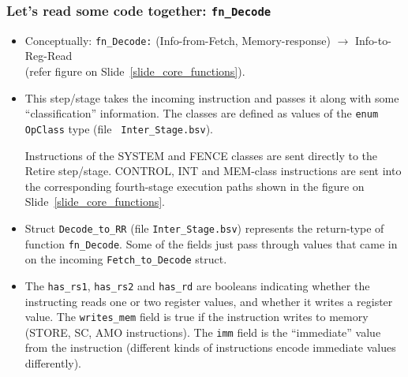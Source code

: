 \begin{frame}[fragile]
\frametitle{Let's read some code together: {\tt fn\_Decode}}

\begin{center}\scriptsize


 \vspace{1ex}

 \begin{minipage}{0.8\textwidth}
  \begin{itemize}

   \item Conceptually: {\tt fn\_Decode:} (Info-from-Fetch, Memory-response) $\rightarrow$ Info-to-Reg-Read \\
     (refer figure on Slide~\ref{slide_core_functions}).

   \item This step/stage takes the incoming instruction and passes it
     along with some ``classification'' information.  The classes are
     defined as values of the {\tt enum OpClass} type (file {\tt
     Inter\_Stage.bsv}).

     Instructions of the SYSTEM and FENCE classes are sent directly to
     the Retire step/stage.  CONTROL, INT and MEM-class instructions
     are sent into the corresponding fourth-stage execution paths
     shown in the figure on Slide~\ref{slide_core_functions}.

   \item Struct {\tt Decode\_to\_RR} (file {\tt Inter\_Stage.bsv})
     represents the return-type of function {\tt fn\_Decode}.  Some of
     the fields just pass through values that came in on the incoming
     {\tt Fetch\_to\_Decode} struct.

   \item The {\tt has\_rs1}, {\tt has\_rs2} and {\tt has\_rd} are
     booleans indicating whether the instructing reads one or two
     register values, and whether it writes a register value.  The
     {\tt writes\_mem} field is true if the instruction writes to
     memory (STORE, SC, AMO instructions).  The {\tt imm} field is the
     ``immediate'' value from the instruction (different kinds of
     instructions encode immediate values differently).


\end{itemize}
\end{minipage}
\end{center}
\end{frame}
